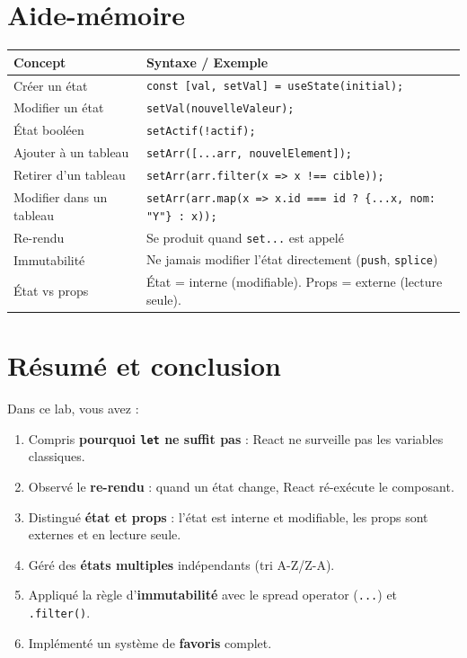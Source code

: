 \documentclass[11pt,a4paper]{article}
\begin{document}
\section{Aide-mémoire}
\label{sec:aide-memoire}

\begin{center}
\begin{tabular}{lp{8cm}}
\toprule
\textbf{Concept} & \textbf{Syntaxe / Exemple} \\
\midrule
Créer un état & \texttt{const [val, setVal] = useState(initial);} \\
Modifier un état & \texttt{setVal(nouvelleValeur);} \\
État booléen & \texttt{setActif(!actif);} \\
\midrule
Ajouter à un tableau & \texttt{setArr([...arr, nouvelElement]);} \\
Retirer d'un tableau & \texttt{setArr(arr.filter(x => x !== cible));} \\
Modifier dans un tableau & \texttt{setArr(arr.map(x => x.id === id ? \{...x, nom: "Y"\} : x));} \\
\midrule
Re-rendu & Se produit quand \texttt{set...} est appelé \\
Immutabilité & Ne jamais modifier l'état directement (\texttt{push}, \texttt{splice}) \\
État vs props & État = interne (modifiable). Props = externe (lecture seule). \\
\bottomrule
\end{tabular}
\end{center}

\newpage

\section{Résumé et conclusion}

Dans ce lab, vous avez :

\begin{enumerate}[nosep]
    \item Compris \textbf{pourquoi \texttt{let} ne suffit pas} : React ne surveille pas les variables classiques.
    \item Observé le \textbf{re-rendu} : quand un état change, React ré-exécute le composant.
    \item Distingué \textbf{état et props} : l'état est interne et modifiable, les props sont externes et en lecture seule.
    \item Géré des \textbf{états multiples} indépendants (tri A-Z/Z-A).
    \item Appliqué la règle d'\textbf{immutabilité} avec le spread operator (\texttt{...}) et \texttt{.filter()}.
    \item Implémenté un système de \textbf{favoris} complet.
\end{enumerate}
\end{document}
